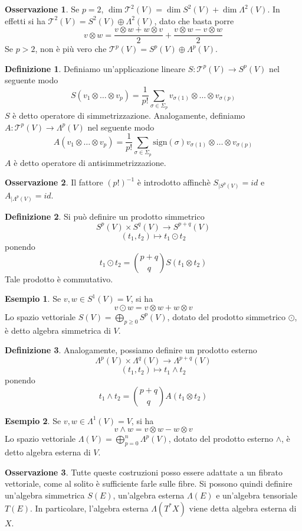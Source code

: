 \documentclass[a4paper,11pt]{article}
\theoremstyle{definition}
\newtheorem{osservazione}{Osservazione}[section]
\newtheorem{definizione}{Definizione}[section]
\newtheorem{esempio}{Esempio}[section]
\theoremstyle{theorem}
\newcommand{\T}{\mathcal{T}}
\begin{document}
\begin{osservazione}
	Se $p=2$,  $\dim \T^2(V)=\dim S^2(V)+\dim\Lambda^2(V)$. In effetti si ha $\T^2(V)=S^2(V)\oplus\Lambda^2(V)$, dato che basta porre
	\[v\otimes w=\frac{v\otimes w+w\otimes v}{2}+\frac{v\otimes w-v\otimes w}{2}\]
	Se $p>2$, non è più vero che $\T^p(V)=S^p(V)\oplus\Lambda^p(V)$.
\end{osservazione}
\begin{definizione}
	Definiamo un'applicazione lineare $S\colon \T^p(V)\to S^p(V)$ nel seguente modo
	\[S(v_1\otimes\dots\otimes v_p)=\frac{1}{p!}\sum_{\sigma\in\Sigma_p}v_{\sigma(1)}\otimes\dots\otimes v_{\sigma(p)}\]
	$S$ è detto operatore di simmetrizzazione. Analogamente, definiamo $A\colon \T^p(V)\to\Lambda^p(V)$ nel seguente modo
	\[A(v_1\otimes\dots\otimes v_p)=\frac{1}{p!}\sum_{\sigma\in\Sigma_p}\textrm{sign}(\sigma)v_{\sigma(1)}\otimes\dots\otimes v_{\sigma(p)}\]
	$A$ è detto operatore di antisimmetrizzazione.
\end{definizione}
\begin{osservazione}
	Il fattore $(p!)^{-1}$ è introdotto affinchè $S_{|S^p(V)}=id$ e $A_{|\Lambda^p(V)}=id$.
\end{osservazione}
\begin{definizione}
	Si può definire un prodotto simmetrico
	\[S^p(V)\times S^q(V)\to S^{p+q}(V)\]
	\[(t_1,t_2)\mapsto t_1\odot t_2\]
	ponendo
	\[t_1\odot t_2=\binom{p+q}{q}S(t_1\otimes t_2)\]
	Tale prodotto è commutativo.
\end{definizione}
\begin{esempio}
	Se $v,w\in S^1(V)=V$, si ha
	\[v\odot w=v\otimes w+w\otimes v\]
	Lo spazio vettoriale $S(V)=\bigoplus_{p\geq0}S^p(V)$, dotato del prodotto simmetrico $\odot$, è detto algebra simmetrica di $V$.
\end{esempio}
\begin{definizione}
	Analogamente, possiamo definire un prodotto esterno
	\[\Lambda^p(V)\times\Lambda^q(V)\to\Lambda^{p+q}(V)\]
	\[(t_1,t_2)\mapsto t_1\wedge t_2\]
	ponendo
	\[t_1\wedge t_2=\binom{p+q}{q}A(t_1\otimes t_2)\]
\end{definizione}
\begin{esempio}
	Se $v,w\in\Lambda^1(V)=V$, si ha
	\[v\wedge w=v\otimes w-w\otimes v\]
	Lo spazio vettoriale $\Lambda(V)=\bigoplus_{p=0}^{n}\Lambda^p(V)$, dotato del prodotto esterno $\wedge$, è detto algebra esterna di $V$.
\end{esempio}
\begin{osservazione}
	Tutte queste costruzioni posso essere adattate a un fibrato vettoriale, come al solito è sufficiente farle sulle fibre. Si possono quindi definire un'algebra simmetrica $S(E)$, un'algebra esterna $\Lambda(E)$ e un'algebra tensoriale $T(E)$. In particolare, l'algebra esterna $\Lambda(T^*X)$ viene detta algebra esterna di $X$.
\end{osservazione}
\end{document}
